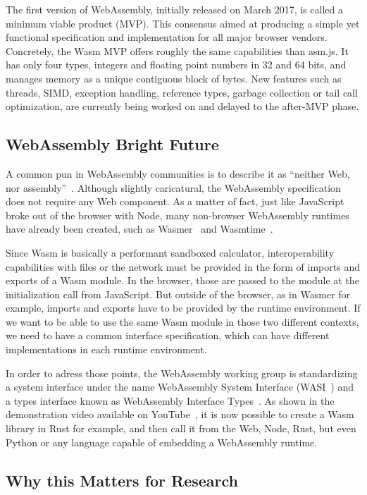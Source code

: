 The first version of WebAssembly, initially released on March 2017,
is called a minimum viable product (MVP).
This consensus aimed at producing a simple yet functional specification and implementation
for all major browser vendors.
Concretely, the Wasm MVP offers roughly the same capabilities than asm.js.
It has only four types, integers and floating point numbers in 32 and 64 bits,
and manages memory as a unique contiguous block of bytes.
New features such as threads,
SIMD, exception handling, reference types, garbage collection or tail call optimization,
are currently being worked on and delayed to the after-MVP phase.

\subsection{WebAssembly Bright Future}%
\label{sub:wasm-future}

A common pun in WebAssembly communities is to describe it
as ``neither Web, nor assembly''~\cite{jayphelps2019wasm}.
Although slightly caricatural, the WebAssembly specification does not require any Web component.
As a matter of fact, just like JavaScript broke out of the browser with Node,
many non-browser WebAssembly runtimes have already been created, such as Wasmer~\cite{wasmer}
and Wasmtime~\cite{wasmtime}.

Since Wasm is basically a performant sandboxed calculator,
interoperability capabilities with files or the network
must be provided in the form of imports and exports of a Wasm module.
In the browser, those are passed to the module at the initialization call from JavaScript.
But outside of the browser, as in Wasmer for example,
imports and exports have to be provided by the runtime environment.
If we want to be able to use the same Wasm module in those two different contexts,
we need to have a common interface specification,
which can have different implementations in each runtime environment.

In order to adress those points, the WebAssembly working group
is standardizing a system interface under the name
WebAssembly System Interface (WASI~\cite{wasi}) and a types interface
known as WebAssembly Interface Types~\cite{wait}.
As shown in the demonstration video available on YouTube~\cite{waitvideo},
it is now possible to create a Wasm library in Rust for example,
and then call it from the Web, Node, Rust, but even Python or any language
capable of embedding a WebAssembly runtime.

\subsection{Why this Matters for Research}%
\label{sub:matter-research}

